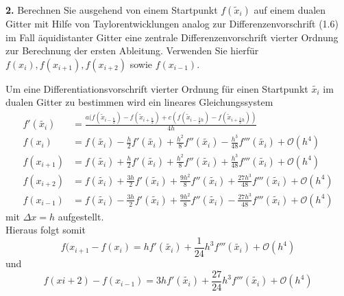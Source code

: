 \documentclass[Protokollheft.tex]{subfiles}
\begin{document}
	
	\begin{framed}
		\noindent \textbf{2.} Berechnen Sie ausgehend von einem Startpunkt \(f(\tilde{x}_i)\) auf einem dualen Gitter mit Hilfe von Taylorentwicklungen analog zur Differenzenvorschrift (1.6) im Fall äquidistanter Gitter eine zentrale Differenzenvorschrift vierter Ordnung zur Berechnung der ersten Ableitung. Verwenden Sie hierfür \(f(x_i), f(x_{i+1}), f(x_{i+2})\) sowie \(f(x_{i-1})\).\label{exer:diffquotOrd4}
	\end{framed}
	\noindent
	Um eine Differentiationsvorschrift vierter Ordnung für einen Startpunkt $\tilde{x_i}$ im dualen Gitter zu bestimmen wird ein lineares Gleichungssystem 
	\begin{align}
		\label{eq:dgl}
		f'(\tilde{x_i}) &= \frac{a(f(\tilde{x}_{i-\frac{h}{2}})-f(\tilde{x}_{i+\frac{h}{2}})+c(f(\tilde{x}_{i-\frac{3}{2}h})-f(\tilde{x}_{i+\frac{3}{2}h}))}{4h} \nonumber\\
		f({x_i}) & = f(\tilde{x_i}) - \frac{h}{2}f'(\tilde{x_i})+\frac{h^2}{8}f''(\tilde{x_i})-\frac{h^3}{48}f'''(\tilde{x_i}) + \mathcal{O}(h^4) \nonumber\\
		f({x_{i+1}}) & = f(\tilde{x_i}) + \frac{h}{2}f'(\tilde{x_i})+\frac{h^2}{8}f''(\tilde{x_i})+\frac{	h^3}{48}f'''(\tilde{x_i}) + \mathcal{O}(h^4)\\
		f({x_{i+2}}) & = f(\tilde{x_i}) + \frac{3h}{2}f'(\tilde{x_i})+\frac{9h^2}{8}f''(\tilde{x_i})+\frac{27h^3}{48}f'''(\tilde{x_i}) + \mathcal{O}(h^4) \nonumber\\
		f({x_{i-1}}) & = f(\tilde{x_i}) - \frac{3h}{2}f'(\tilde{x_i})+\frac{9h^2}{8}f''(\tilde{x_i})-\frac{27h^3}{48}f'''(\tilde{x_i}) + \mathcal{O}(h^4) \nonumber
	\end{align}
	mit $\Delta x = h$ aufgestellt. \\
	Hieraus folgt somit
	\begin{equation}
	\label{eq:LGS}
	f(x_{i+1} - f(x_i) = hf'(\tilde{x_i}) + \frac{1}{24}h^3 f'''(\tilde{x_i})+\mathcal{O}(h^4) 
	\end{equation}
	und
	\begin{equation}
	\label{eq:LGS2}
	f(x{i+2}) - f(x_{i-1})=3hf'(\tilde{x_i}) + \frac{27}{24}h^3f'''(\tilde{x_i}) + \mathcal{O}(h^4)
	\end{equation}
	
\end{document}
